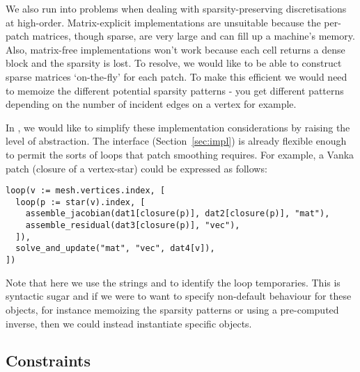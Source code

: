 We also run into problems when dealing with sparsity-preserving discretisations at high-order.
Matrix-explicit implementations are unsuitable because the per-patch matrices, though sparse, are very large and can fill up a machine's memory.
Also, matrix-free implementations won't work because each cell returns a dense block and the sparsity is lost.
To resolve, we would like to be able to construct sparse matrices `on-the-fly' for each patch.
To make this efficient we would need to memoize the different potential sparsity patterns - you get different patterns depending on the number of incident edges on a vertex for example.

In , we would like to simplify these implementation considerations by raising the level of abstraction.
The  interface (Section~\ref{sec:impl}) is already flexible enough to permit the sorts of loops that patch smoothing requires.
For example, a Vanka patch (closure of a vertex-star) could be expressed as follows:

\begin{verbatim}
loop(v := mesh.vertices.index, [
  loop(p := star(v).index, [
    assemble_jacobian(dat1[closure(p)], dat2[closure(p)], "mat"),
    assemble_residual(dat3[closure(p)], "vec"),
  ]),
  solve_and_update("mat", "vec", dat4[v]),
])
\end{verbatim}

Note that here we use the strings  and  to identify the loop temporaries.
This is syntactic sugar and if we were to want to specify non-default behaviour for these objects, for instance memoizing the sparsity patterns or using a pre-computed inverse, then we could instead instantiate specific  objects.

\subsection{Constraints}
\label{sec:future_constraints}

%
%
%
%
%
%

